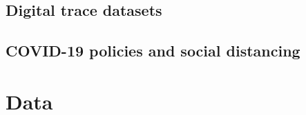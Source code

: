 \documentclass{article}
\begin{document}
\subsection{Digital trace datasets}
\subsection{COVID-19 policies and social distancing}

\section{Data}


\end{document}
